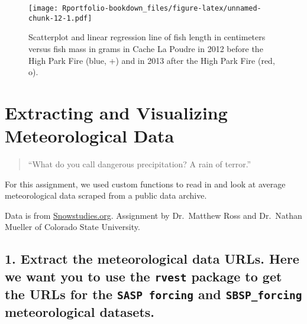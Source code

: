 \documentclass[
]{book}
\begin{document}
\begin{figure}
\centering
\texttt{[image: Rportfolio-bookdown\_files/figure-latex/unnamed-chunk-12-1.pdf]}
\caption{\label{fig:unnamed-chunk-12}Scatterplot and linear regression line of fish length in centimeters versus fish mass in grams in Cache La Poudre in 2012 before the High Park Fire (blue, +) and in 2013 after the High Park Fire (red, o).}
\end{figure}

\hypertarget{extracting-and-visualizing-meteorological-data}{%
\chapter{Extracting and Visualizing Meteorological Data}\label{extracting-and-visualizing-meteorological-data}}

\begin{quote}
``What do you call dangerous precipitation? A rain of terror.''
\end{quote}

For this assignment, we used custom functions to read in and look at average meteorological data scraped from a public data archive.

Data is from \href{https://snowstudies.org/archived-data/}{Snowstudies.org}. Assignment by Dr.~Matthew Ross and Dr.~Nathan Mueller of Colorado State University.

\hypertarget{extract-the-meteorological-data-urls.-here-we-want-you-to-use-the-rvest-package-to-get-the-urls-for-the-sasp-forcing-and-sbsp_forcing-meteorological-datasets.}{%
\section{\texorpdfstring{1. Extract the meteorological data URLs. Here we want you to use the \texttt{rvest} package to get the URLs for the \texttt{SASP\ forcing} and \texttt{SBSP\_forcing} meteorological datasets.}{1. Extract the meteorological data URLs. Here we want you to use the rvest package to get the URLs for the SASP forcing and SBSP\_forcing meteorological datasets.}}\label{extract-the-meteorological-data-urls.-here-we-want-you-to-use-the-rvest-package-to-get-the-urls-for-the-sasp-forcing-and-sbsp_forcing-meteorological-datasets.}}
\end{document}
